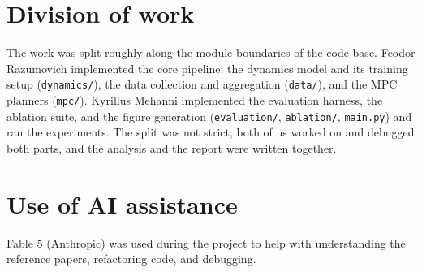 \documentclass{article}
\begin{document}
\section*{Division of work}

The work was split roughly along the module boundaries of the code base. Feodor Razumovich implemented the core pipeline: the dynamics model and its training setup (\texttt{dynamics/}), the data collection and aggregation (\texttt{data/}), and the MPC planners (\texttt{mpc/}). Kyrillus Mehanni implemented the evaluation harness, the ablation suite, and the figure generation (\texttt{evaluation/}, \texttt{ablation/}, \texttt{main.py}) and ran the experiments. The split was not strict; both of us worked on and debugged both parts, and the analysis and the report were written together.

\section*{Use of AI assistance}

Fable 5 (Anthropic) was used during the project to help with understanding the reference papers, refactoring code, and debugging.



\end{document}
